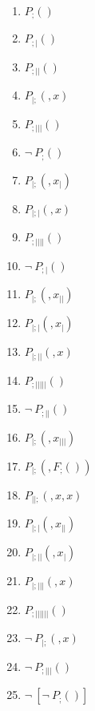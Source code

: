 \documentclass{article}
\begin{document}
\begin{enumerate}

\item $P_{;}()$

\item $P_{;|}()$

\item $P_{;||}()$

\item $P_{|;}(,x)$

\item $P_{;|||}()$

\item $\neg \ P_{;}()$

\item $P_{|;}(,x_{|})$

\item $P_{|;|}(,x)$

\item $P_{;||||}()$

\item $\neg \ P_{;|}()$

\item $P_{|;}(,x_{||})$

\item $P_{|;|}(,x_{|})$

\item $P_{|;||}(,x)$

\item $P_{;|||||}()$

\item $\neg \ P_{;||}()$

\item $P_{|;}(,x_{|||})$

\item $P_{|;}(,F_{;}())$

\item $P_{||;}(,x,x)$

\item $P_{|;|}(,x_{||})$

\item $P_{|;||}(,x_{|})$

\item $P_{|;|||}(,x)$

\item $P_{;||||||}()$

\item $\neg \ P_{|;}(,x)$

\item $\neg \ P_{;|||}()$

\item $\neg \ [\neg \ P_{;}()]$

\end{enumerate}
\end{document}
